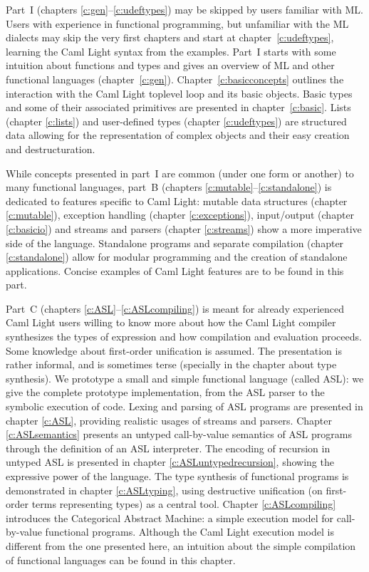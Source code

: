 Part~I (chapters \ref{c:gen}--\ref{c:udeftypes}) may be skipped by
users familiar with ML. Users with experience in functional programming,
but unfamiliar with the ML dialects may skip the very first chapters and
start at chapter~\ref{c:udeftypes}, learning the Caml Light syntax
from the examples.  Part~I starts with some intuition about functions
and types and gives an overview of ML and other functional languages
(chapter~\ref{c:gen}). Chapter~\ref{c:basicconcepts} outlines the
interaction with the Caml Light toplevel loop and its basic objects.
Basic types and some of their associated primitives are presented in
chapter~\ref{c:basic}. Lists (chapter \ref{c:lists}) and user-defined
types (chapter \ref{c:udeftypes}) are structured data allowing for the
representation of complex objects and their easy creation and
destructuration.

While concepts presented in part~I are common (under one form or
another) to many functional languages, part~B (chapters
\ref{c:mutable}--\ref{c:standalone}) is dedicated to features
specific to Caml Light: mutable data structures (chapter
\ref{c:mutable}), exception handling (chapter \ref{c:exceptions}),
input/output (chapter \ref{c:basicio}) and streams and parsers (chapter
\ref{c:streams}) show a more imperative side of the language.
Standalone programs and separate compilation (chapter
\ref{c:standalone}) allow for modular programming and the creation of
standalone applications. Concise examples of Caml Light features are
to be found in this part.

Part~C (chapters \ref{c:ASL}--\ref{c:ASLcompiling}) is meant for
already experienced Caml Light users willing to know more about how
the Caml Light compiler synthesizes the types of expression and how
compilation and evaluation proceeds.  Some knowledge about first-order
unification is assumed. The presentation is rather informal, and is
sometimes terse (specially in the chapter about type synthesis). We
prototype a small and simple functional language (called ASL): we give
the complete prototype implementation, from the ASL parser to the
symbolic execution of code.  Lexing and parsing of ASL programs are
presented in chapter
\ref{c:ASL}, providing realistic usages of streams and parsers.
Chapter \ref{c:ASLsemantics} presents an untyped call-by-value
semantics of ASL programs through the definition of an ASL
interpreter. The encoding of recursion in untyped ASL is presented in
chapter \ref{c:ASLuntypedrecursion}, showing the expressive power of
the language. The type synthesis of functional programs is
demonstrated in chapter \ref{c:ASLtyping}, using destructive
unification (on first-order terms representing types) as a central
tool.  Chapter \ref{c:ASLcompiling} introduces the Categorical
Abstract Machine: a simple execution model for call-by-value
functional programs. Although the Caml Light execution model is
different from the one presented here, an intuition about the simple
compilation of functional languages can be found in this chapter.

